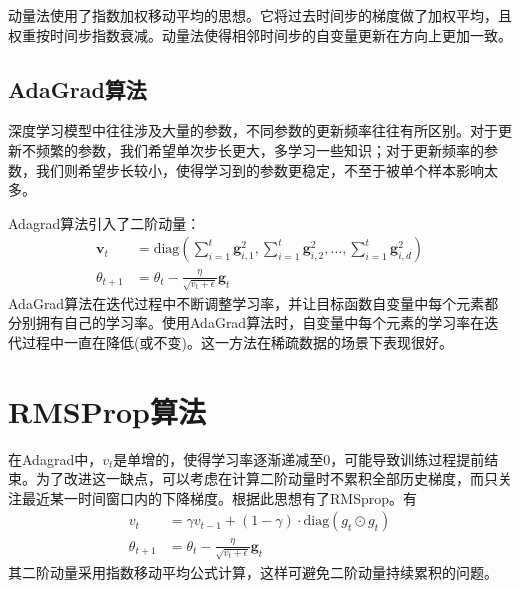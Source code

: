 动量法使用了指数加权移动平均的思想。它将过去时间步的梯度做了加权平均，且权重按时间步指数衰减。动量法使得相邻时间步的自变量更新在方向上更加一致。
\subsection{AdaGrad算法}
深度学习模型中往往涉及大量的参数，不同参数的更新频率往往有所区别。对于更新不频繁的参数，我们希望单次步长更大，多学习一些知识；对于更新频率的参数，我们则希望步长较小，使得学习到的参数更稳定，不至于被单个样本影响太多。

Adagrad算法引入了二阶动量：
\begin{equation}
	\begin{aligned}
		\boldsymbol{v}_t&=\mathrm{diag}(\sum_{i=1}^{t}\boldsymbol{g}_{i,1}^2, \sum_{i=1}^{t}\boldsymbol{g}_{i,2}^2, \dots, \sum_{i=1}^{t}\boldsymbol{g}_{i,d}^2)\\
		\theta_{t+1} &= \theta_{t} - \frac{\eta}{\sqrt{v_t + \epsilon}}\boldsymbol{g}_t
	\end{aligned}
\end{equation}
AdaGrad算法在迭代过程中不断调整学习率，并让目标函数自变量中每个元素都分别拥有自己的学习率。使用AdaGrad算法时，自变量中每个元素的学习率在迭代过程中一直在降低(或不变)。这一方法在稀疏数据的场景下表现很好。
\section{RMSProp算法}
在Adagrad中，$v_t$是单增的，使得学习率逐渐递减至0，可能导致训练过程提前结束。为了改进这一缺点，可以考虑在计算二阶动量时不累积全部历史梯度，而只关注最近某一时间窗口内的下降梯度。根据此思想有了RMSprop。有
\begin{equation}
	\begin{aligned}
		v_t &= \gamma v_{t-1} + (1-\gamma)\cdot \mathrm{diag}(g_t \odot g_t)\\
		\theta_{t+1} &= \theta_{t} - \frac{\eta}{\sqrt{v_t + \epsilon}}\boldsymbol{g}_t
	\end{aligned}
\end{equation}
其二阶动量采用指数移动平均公式计算，这样可避免二阶动量持续累积的问题。
